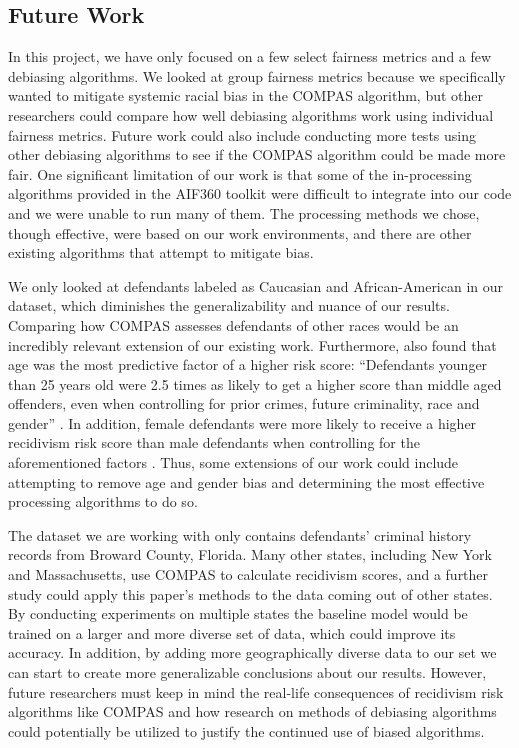 \documentclass[water,article,submit,moreauthors,pdftex]{mdpi}
\begin{document}
\hypertarget{future-work}{%
\subsection{Future Work}\label{future-work}}

In this project, we have only focused on a few select fairness metrics
and a few debiasing algorithms. We looked at group fairness metrics
because we specifically wanted to mitigate systemic racial bias in the
COMPAS algorithm, but other researchers could compare how well debiasing
algorithms work using individual fairness metrics. Future work could
also include conducting more tests using other debiasing algorithms to
see if the COMPAS algorithm could be made more fair. One significant
limitation of our work is that some of the in-processing algorithms
provided in the AIF360 toolkit were difficult to integrate into our code
and we were unable to run many of them. The processing methods we chose,
though effective, were based on our work environments, and there are
other existing algorithms that attempt to mitigate bias.

We only looked at defendants labeled as Caucasian and African-American
in our dataset, which diminishes the generalizability and nuance of our
results. Comparing how COMPAS assesses defendants of other races would
be an incredibly relevant extension of our existing work. Furthermore,
\citet{larson2016we} also found that age was the most predictive factor
of a higher risk score: ``Defendants younger than 25 years old were 2.5
times as likely to get a higher score than middle aged offenders, even
when controlling for prior crimes, future criminality, race and gender''
\citep{larson2016we}. In addition, female defendants were more likely to
receive a higher recidivism risk score than male defendants when
controlling for the aforementioned factors \citep{larson2016we}. Thus,
some extensions of our work could include attempting to remove age and
gender bias and determining the most effective processing algorithms to
do so.

The dataset we are working with only contains defendants' criminal
history records from Broward County, Florida. Many other states,
including New York and Massachusetts, use COMPAS to calculate recidivism
scores, and a further study could apply this paper's methods to the data
coming out of other states. By conducting experiments on multiple states
the baseline model would be trained on a larger and more diverse set of
data, which could improve its accuracy. In addition, by adding more
geographically diverse data to our set we can start to create more
generalizable conclusions about our results. However, future researchers
must keep in mind the real-life consequences of recidivism risk
algorithms like COMPAS and how research on methods of debiasing
algorithms could potentially be utilized to justify the continued use of
biased algorithms.
\end{document}
